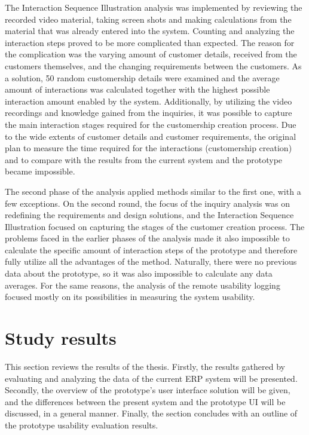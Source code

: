 \documentclass[12pt,a4paper,oneside,pdftex]{report}
\begin{document}
The Interaction Sequence Illustration analysis was implemented by reviewing the recorded video material, taking screen shots  and making calculations from the material that was already entered into the system. Counting and analyzing the interaction steps proved to be more complicated than expected. The reason for the complication was the varying amount of customer details, received from the customers themselves, and the changing requirements between the customers. As a solution, 50 random customership details were examined and the average amount of interactions was calculated together with the highest possible interaction amount enabled by the system. Additionally, by utilizing the video recordings and knowledge gained from the inquiries, it was possible to capture the main interaction stages required for the customership creation process. Due to the wide extents of customer details and customer requirements, the original plan to measure the time required for the interactions (customership creation) and to compare with the results from the current system and the prototype became impossible. 

The second phase of the analysis applied methods similar to the first one, with a few exceptions.  On the second round, the focus of the inquiry analysis was on redefining the requirements and design solutions, and the Interaction Sequence Illustration focused on capturing the stages of the customer creation process. The problems faced in the earlier phases of the analysis made it also impossible to calculate the specific amount of interaction steps of the prototype and therefore fully utilize all the advantages of the method. Naturally, there were no previous data about the prototype, so it was also impossible to calculate any data averages. For the same reasons, the analysis of the remote usability logging focused mostly on its possibilities in measuring the system usability. 


\section{Study results}
\label{sec:results}
This section reviews the results of the thesis. Firstly, the results gathered by evaluating and analyzing the data of the current ERP system will be presented. Secondly, the overview of the prototype's user interface solution will be given, and the differences between the present system and the prototype UI will be discussed, in a general manner. Finally, the section concludes with an outline of the prototype usability evaluation results. 
    
\end{document}
